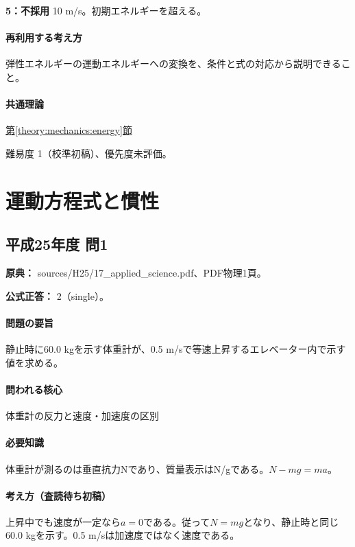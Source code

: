 \noindent\textbf{5：不採用} 10 m/s。初期エネルギーを超える。\par

\paragraph{再利用する考え方} 弾性エネルギーの運動エネルギーへの変換を、条件と式の対応から説明できること。

\paragraph{共通理論} \hyperref[theory:mechanics:energy]{第\ref*{theory:mechanics:energy}節}

\par 難易度 1（校準初稿）、優先度未評価。

\section{運動方程式と慣性}

\subsection{平成25年度 問1}
\label{q:h25-reg-applied-01}

\noindent\textbf{原典：} sources/H25/17\_applied\_science.pdf、PDF物理1頁。

\textbf{公式正答：} 2（single）。

\paragraph{問題の要旨} 静止時に60.0 kgを示す体重計が、0.5 m/sで等速上昇するエレベーター内で示す値を求める。

\paragraph{問われる核心} 体重計の反力と速度・加速度の区別

\paragraph{必要知識} 体重計が測るのは垂直抗力Nであり、質量表示はN/gである。\(N-mg=ma\)。

\paragraph{考え方（査読待ち初稿）} 上昇中でも速度が一定なら\(a=0\)である。従って\(N=mg\)となり、静止時と同じ60.0 kgを示す。0.5 m/sは加速度ではなく速度である。

